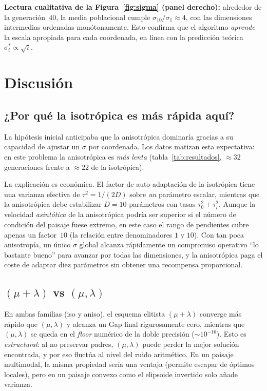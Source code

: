 \documentclass[12pt,letterpaper]{article}
\begin{document}
\begin{resultbox}
\textbf{Lectura cualitativa de la Figura~\ref{fig:sigma} (panel derecho):} alrededor de la generación~40, la media poblacional cumple $\sigma_{10}/\sigma_{1}\approx 4$, con las dimensiones intermedias ordenadas monótonamente. Esto confirma que el algoritmo \emph{aprende} la escala apropiada para cada coordenada, en línea con la predicción teórica $\sigma_i^{*}\propto\sqrt{i}$.
\end{resultbox}

\newpage
\section{Discusión}

\subsection{\texorpdfstring{¿Por qué la isotrópica es más rápida aquí?}{Por que la isotropica es mas rapida aqui?}}

La hipótesis inicial anticipaba que la anisotrópica dominaría gracias a su capacidad de ajustar un $\sigma$ por coordenada. Los datos matizan esta expectativa: en este problema la anisotrópica es \emph{más lenta} (tabla~\ref{tab:resultados}, $\approx 32$ generaciones frente a $\approx 22$ de la isotrópica).

La explicación es económica. El factor de auto-adaptación de la isotrópica tiene una varianza efectiva de $\tau^{2}=1/(2D)$ sobre \emph{un} parámetro escalar, mientras que la anisotrópica debe estabilizar $D=10$ parámetros con tasas $\tau_0^{2}+\tau_i^{2}$. Aunque la velocidad \emph{asintótica} de la anisotrópica podría ser superior si el número de condición del paisaje fuese extremo, en este caso el rango de pendientes cubre apenas un factor~$10$ (la relación entre denominadores $1$ y $10$). Con tan poca anisotropía, un único $\sigma$ global alcanza rápidamente un compromiso operativo ``lo bastante bueno'' para avanzar por todas las dimensiones, y la anisotrópica paga el coste de adaptar diez parámetros sin obtener una recompensa proporcional.

\subsection{\texorpdfstring{$(\mu+\lambda)$ vs $(\mu,\lambda)$}{(mu+lambda) vs (mu,lambda)}}

En ambas familias (iso y aniso), el esquema elitista $(\mu+\lambda)$ converge más rápido que $(\mu,\lambda)$ y alcanza un Gap final rigurosamente cero, mientras que $(\mu,\lambda)$ se queda en el \textit{floor} numérico de la doble precisión ($\sim 10^{-16}$). Esto es \emph{estructural}: al no preservar padres, $(\mu,\lambda)$ puede perder la mejor solución encontrada, y por eso fluctúa al nivel del ruido aritmético. En un paisaje multimodal, la misma propiedad sería una ventaja (permite escapar de óptimos locales), pero en un paisaje convexo como el elipsoide invertido solo añade varianza.
\end{document}
